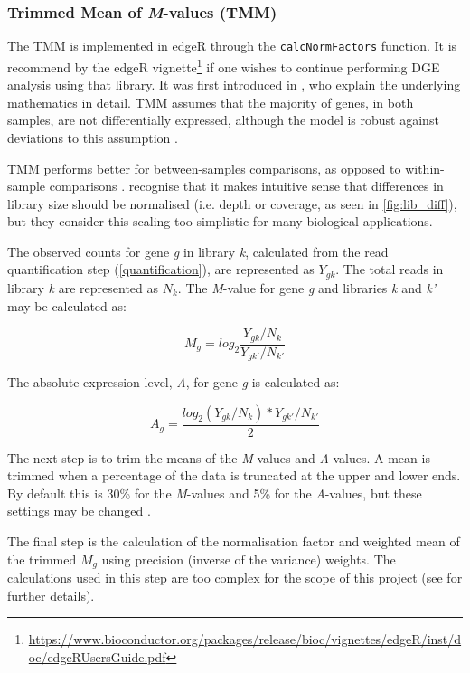 \subsubsection{Trimmed Mean of \textit{M}-values (TMM)}
\label{TMM}

The \ac{TMM} is implemented in edgeR \citep{edger} through the \texttt{calcNormFactors} function. It is recommend by the edgeR vignette\footnote{\url{https://www.bioconductor.org/packages/release/bioc/vignettes/edgeR/inst/doc/edgeRUsersGuide.pdf}} if one wishes to continue performing \ac{DGE} analysis using that library. It was first introduced in \cite{robinson2010scaling}, who explain the underlying mathematics in detail. \ac{TMM} assumes that the majority of genes, in both samples, are not differentially expressed, although the model is robust against deviations to this assumption \citep{robinson2010scaling}. 

\ac{TMM} performs better for between-samples comparisons, as opposed to within-sample comparisons \citep{dundar2015introduction}. \cite{robinson2010scaling} recognise that it makes intuitive sense that differences in library size should be normalised (i.e. depth or coverage, as seen in \autoref{fig:lib_diff}), but they consider this scaling too simplistic for many biological applications. 

The observed counts for gene \textit{g} in library \textit{k}, calculated from the read quantification step (\autoref{quantification}), are represented as $Y_{gk}$. The total reads in library \textit{k} are represented as $N_k$. The  \textit{M}-value for gene \textit{g} and libraries \textit{k} and \textit{k'} may be calculated as:

$$ M_g = log_2 \frac{Y_{gk}/N_k}{Y_{gk'}/N_{k'}}$$

The absolute expression level, \textit{A}, for gene \textit{g} is calculated as:

$$A_g = \frac{log_2(Y_{gk}/N_k)*Y_{gk'}/N_{k'}}{2}$$

The next step is to trim the means of the \textit{M}-values and \textit{A}-values. A mean is trimmed when a percentage of the data is truncated at the upper and lower ends. By default this is 30\% for the \textit{M}-values and 5\% for the \textit{A}-values, but these settings may be changed \citep{robinson2010scaling}. 

The final step is the calculation of the normalisation factor and weighted mean of the trimmed $M_g$ using precision (inverse of the variance) weights. The calculations used in this step are too complex for the scope of this project (see \cite{robinson2010scaling} for further details). 



